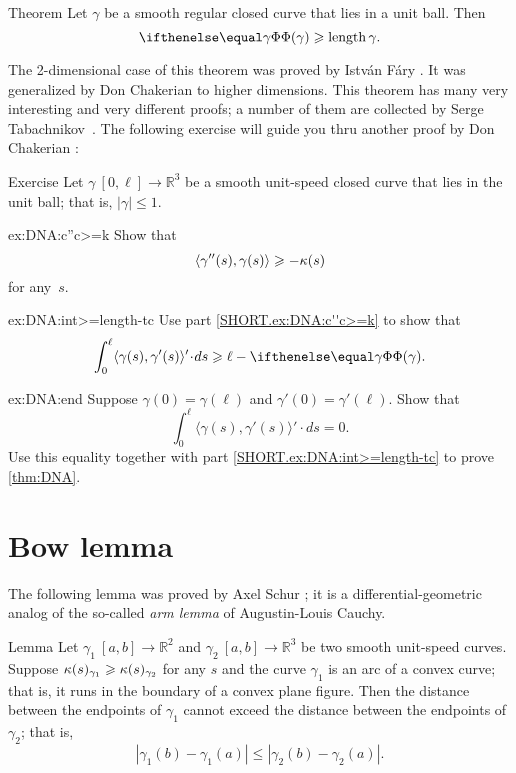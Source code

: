 \begin{thm}{Theorem}\label{thm:DNA}
Let $\gamma$ be a smooth regular closed curve that lies in a unit ball.
Then 
\[\tc\gamma\ge \length\gamma.\]

\end{thm}

The 2-dimensional case of this theorem was proved by Istv\'{a}n F\'{a}ry \cite{fary1950}.
It was generalized by Don Chakerian \cite{chakerian1962} to higher dimensions.
This theorem has many very interesting and very different proofs;
a number of them are collected by Serge Tabachnikov~\cite{tabachnikov}.
The following exercise will guide you thru another proof by Don Chakerian \cite{chakerian1964}:

\begin{thm}{Exercise}\label{ex:DNA}
Let $\gamma\:[0,\ell]\to\mathbb{R}^3$ be a smooth unit-speed closed curve that lies in the unit ball; that is, $|\gamma|\le 1$.

\begin{subthm}{ex:DNA:c''c>=k}
Show that 
\[\langle\gamma''(s),\gamma(s)\rangle\geqslant-\kappa(s)\]
for any~$s$.
\end{subthm}

\begin{subthm}{ex:DNA:int>=length-tc}
Use part \ref{SHORT.ex:DNA:c''c>=k} to show that 
\[\int_0^\ell\langle\gamma(s),\gamma'(s)\rangle'\cdot ds\ge
\ell-\tc\gamma.\]

\end{subthm}

\begin{subthm}{ex:DNA:end}
Suppose $\gamma(0)=\gamma(\ell)$ and $\gamma'(0)=\gamma'(\ell)$.
Show that 
\[\int_0^\ell\langle\gamma(s),\gamma'(s)\rangle'\cdot ds=0.\]
Use this equality together with  part \ref{SHORT.ex:DNA:int>=length-tc} to prove \ref{thm:DNA}.
\end{subthm}
\end{thm}



\section{Bow lemma}

The following lemma was proved by Axel Schur \cite{shur};
it is a differential-geometric analog of the so-called {}\emph{arm lemma} of Augustin-Louis Cauchy.

\begin{thm}{Lemma}\label{lem:bow}
Let $\gamma_1\:[a,b]\to\mathbb{R}^2$ and $\gamma_2\:[a,b] \to\mathbb{R}^3$ be two smooth unit-speed curves.
Suppose $\kappa(s)_{\gamma_1}\geqslant\kappa(s)_{\gamma_2}$ for any $s$ 
and the curve
$\gamma_1$ is an arc of a convex curve; that is, it runs in the boundary of a convex plane figure.
Then the distance between the endpoints of $\gamma_1$ cannot exceed the  distance between the endpoints of $\gamma_2$; that is,
\[|\gamma_1(b)-\gamma_1(a)|\le |\gamma_2(b)-\gamma_2(a)|.\]

\end{thm}

